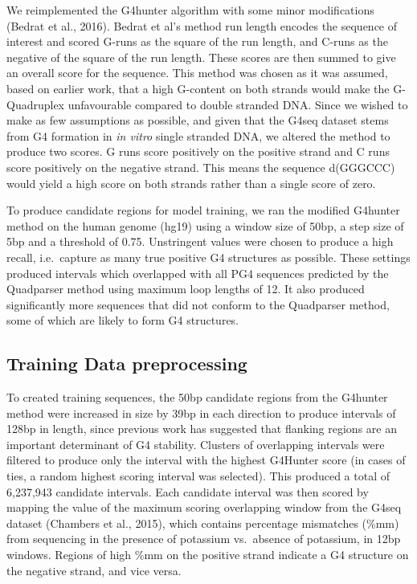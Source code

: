 \documentclass[12pt,a4paper,]{report}
\begin{document}
We reimplemented the G4hunter algorithm with some minor modifications
(Bedrat et al., 2016). Bedrat et al's method run length encodes the
sequence of interest and scored G-runs as the square of the run length,
and C-runs as the negative of the square of the run length. These scores
are then summed to give an overall score for the sequence. This method
was chosen as it was assumed, based on earlier work, that a high
G-content on both strands would make the G-Quadruplex unfavourable
compared to double stranded DNA. Since we wished to make as few
assumptions as possible, and given that the G4seq dataset stems from G4
formation in \emph{in vitro} single stranded DNA, we altered the method
to produce two scores. G runs score positively on the positive strand
and C runs score positively on the negative strand. This means the
sequence d(GGGCCC) would yield a high score on both strands rather than
a single score of zero.

To produce candidate regions for model training, we ran the modified
G4hunter method on the human genome (hg19) using a window size of 50bp,
a step size of 5bp and a threshold of 0.75. Unstringent values were
chosen to produce a high recall, i.e.~capture as many true positive G4
structures as possible. These settings produced intervals which
overlapped with all PG4 sequences predicted by the Quadparser method
using maximum loop lengths of 12. It also produced significantly more
sequences that did not conform to the Quadparser method, some of which
are likely to form G4 structures.

\hypertarget{training-data-preprocessing-1}{%
\subsection{Training Data
preprocessing}\label{training-data-preprocessing-1}}

To created training sequences, the 50bp candidate regions from the
G4hunter method were increased in size by 39bp in each direction to
produce intervals of 128bp in length, since previous work has suggested
that flanking regions are an important determinant of G4 stability.
Clusters of overlapping intervals were filtered to produce only the
interval with the highest G4Hunter score (in cases of ties, a random
highest scoring interval was selected). This produced a total of
6,237,943 candidate intervals. Each candidate interval was then scored
by mapping the value of the maximum scoring overlapping window from the
G4seq dataset (Chambers et al., 2015), which contains percentage
mismatches (\%mm) from sequencing in the presence of potassium
vs.~absence of potassium, in 12bp windows. Regions of high \%mm on the
positive strand indicate a G4 structure on the negative strand, and vice
versa.
\end{document}
